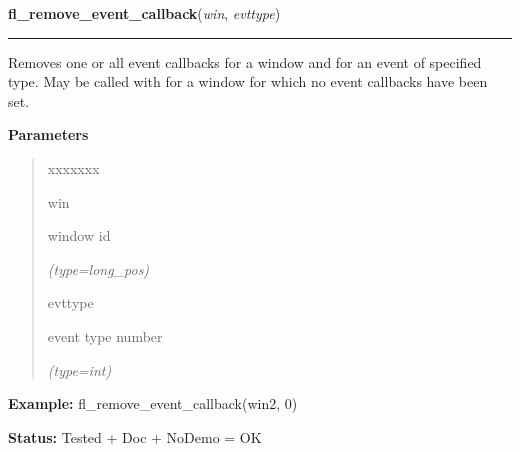 \hspace{.8\funcindent}\begin{boxedminipage}{\funcwidth}

    \raggedright \textbf{fl\_remove\_event\_callback}(\textit{win}, \textit{evttype})

    \vspace{-1.5ex}

    \rule{\textwidth}{0.5\fboxrule}
\setlength{\parskip}{2ex}
    Removes one or all event callbacks for a window and for an event of 
    specified type. May be called with for a window for which no event 
    callbacks have been set.

\setlength{\parskip}{1ex}
      \textbf{Parameters}
      \vspace{-1ex}

      \begin{quote}
        \begin{Ventry}{xxxxxxx}

          \item[win]

          window id

            {\it (type=long\_pos)}

          \item[evttype]

          event type number

            {\it (type=int)}

        \end{Ventry}

      \end{quote}

\textbf{Example:} fl\_remove\_event\_callback(win2, 0)



\textbf{Status:} Tested + Doc + NoDemo = OK



    \end{boxedminipage}

    \label{xformslib:flxbasic:fl_activate_event_callbacks}

    \vspace{0.5ex}

